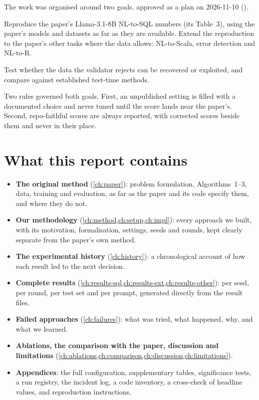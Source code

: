 The work was organised around two goals, approved as a plan on 2026-11-10 ().
\begin{description}[style=nextline,leftmargin=1.2em]
\item[Goal A: match the paper.] Reproduce the paper's Llama-3.1-8B NL-to-SQL numbers (its Table~3), using the paper's
models and datasets as far as they are available. Extend the reproduction to the paper's other tasks where the data
allows: NL-to-Scala, error detection and NL-to-R.
\item[Goal B: improve on it.] Test whether the data the validator rejects can be recovered or exploited, and compare
against established test-time methods.
\end{description}
Two rules governed both goals. First, an unpublished setting is filled with a documented choice and never tuned until
the score lands near the paper's. Second, repo-faithful scores are always reported, with corrected scores beside them
and never in their place.

\section{What this report contains}

\begin{itemize}
\item \textbf{The original method} (\cref{ch:paper}): problem formulation, Algorithms~1--3, data, training and
evaluation, as far as the paper and its code specify them, and where they do not.
\item \textbf{Our methodology} (\cref{ch:method,ch:setup,ch:impl}): every approach we built, with its motivation,
formalisation, settings, seeds and rounds, kept clearly separate from the paper's own method.
\item \textbf{The experimental history} (\cref{ch:history}): a chronological account of how each result led to the
next decision.
\item \textbf{Complete results} (\cref{ch:results-sql,ch:results-ext,ch:results-other}): per seed, per round, per
test set and per prompt, generated directly from the result files.
\item \textbf{Failed approaches} (\cref{ch:failures}): what was tried, what happened, why, and what we learned.
\item \textbf{Ablations, the comparison with the paper, discussion and limitations}
(\cref{ch:ablations,ch:comparison,ch:discussion,ch:limitations}).
\item \textbf{Appendices}: the full configuration, supplementary tables, significance tests, a run registry, the
incident log, a code inventory, a cross-check of headline values, and reproduction instructions.
\end{itemize}

